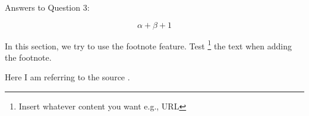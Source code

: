 Answers to Question 3:

\begin{equation}
\alpha + \beta + 1
\end{equation}

In this section, we try to use the footnote feature. Test \footnote{Insert whatever content you want e.g., URL} the text when adding the footnote.

Here I am referring to the source \cite{DataScience}.